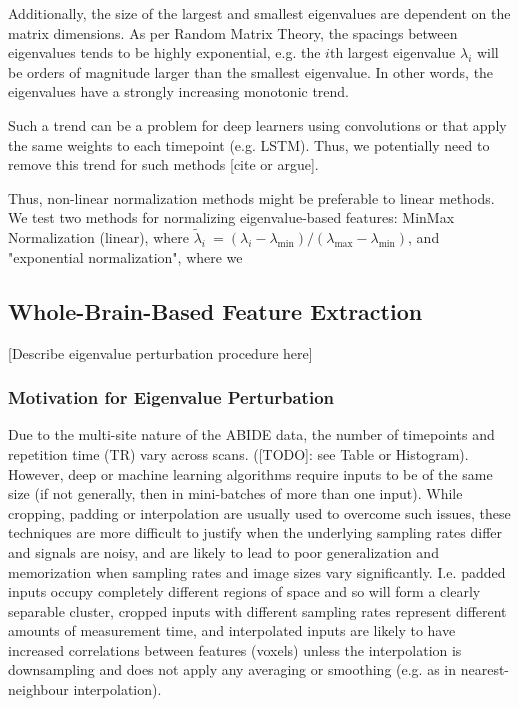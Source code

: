 \documentclass[10pt]{article}
\begin{document}
Additionally, the size of the largest and
smallest eigenvalues are dependent on the matrix dimensions. As per Random Matrix Theory, the
spacings between eigenvalues tends to be highly exponential, e.g. the \(i\)th largest eigenvalue
\(\lambda_i\) will be orders of magnitude larger than the smallest eigenvalue. In other words, the
eigenvalues have a strongly increasing monotonic trend.

Such a trend can be a problem for deep learners using convolutions or that apply the same weights to each timepoint (e.g. LSTM). Thus, we potentially need to remove this trend for such methods [cite or argue].

Thus, non-linear
normalization methods might be preferable to linear methods. We test two methods for normalizing
eigenvalue-based features: MinMax Normalization (linear), where \(\tilde{\lambda}_i\ = (\lambda_i -
\lambda_{\text{min}}) / (\lambda_{\text{max}} - \lambda_{\text{min}})\), and "exponential
normalization", where we

\subsection{Whole-Brain-Based Feature Extraction}

[Describe eigenvalue perturbation procedure here]

\subsubsection{Motivation for Eigenvalue Perturbation}

Due to the multi-site nature of the ABIDE data, the number of timepoints and repetition time (TR)
vary across scans. ([TODO]: see Table or Histogram). However, deep or machine learning algorithms
require inputs to be of the same size (if not generally, then in mini-batches of more than one
input). While cropping, padding or interpolation are usually used to overcome such issues, these
techniques are more difficult to justify when the underlying sampling rates differ and signals are
noisy, and are likely to lead to poor generalization and memorization when sampling rates and image
sizes vary significantly. I.e. padded inputs occupy completely different regions of space and so
will form a clearly separable cluster, cropped inputs with different sampling rates represent
different amounts of measurement time, and interpolated inputs are likely to have increased
correlations between features (voxels) unless the interpolation is downsampling and does not apply
any averaging or smoothing (e.g. as in nearest-neighbour interpolation).
\end{document}

